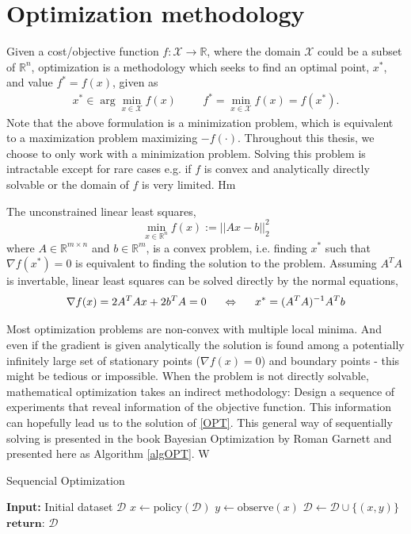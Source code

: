 \section{Optimization methodology}
Given a cost/objective function $f: \mathcal{X} \rightarrow \mathbb{R}$, where the domain
$\mathcal{X}$ could be a subset of $\mathbb{R}^n$,
optimization is a methodology which seeks to find an optimal point, $x^*$, and value
$f^* = f(x)$, given as
\begin{align}\label{OPT}
    x^* \in \arg\min_{x \in \mathcal{X}} f(x) \hspace{1cm} f^* = \min_{x \in \mathcal{X}} f(x) = f(x^*).
\end{align}
Note that the above formulation is a minimization problem, which is equivalent to a
maximization problem maximizing $-f(\cdot)$. Throughout this thesis, we choose to only work
with a minimization problem. 
Solving this problem is intractable except for rare cases e.g. if $f$ is 
convex and analytically directly solvable or the domain of $f$ is very limited. Hm

\begin{testexample}
    The unconstrained linear least squares, $$\min_{x\in \mathbb{R}^n} f(x) := ||Ax-b||_2^2$$
    where $A \in \mathbb{R}^{m\times n}$ and $b \in \mathbb{R}^m$, is a convex problem,
    i.e. finding $x^*$ such that $\nabla f(x^*) = 0$ is equivalent to finding the solution
    to the problem. Assuming $A^TA$ is invertable, linear least squares can be solved
    directly by the normal equations, 
    $$\nabla f(x) = 2A^TAx + 2b^TA = 0 \hspace{0.5cm} \Leftrightarrow \hspace{0.5cm} x^* = (A^TA)^{-1} A^Tb$$
\end{testexample}

Most optimization problems are non-convex with multiple local minima. And even if the gradient is
given analytically the solution is found among a potentially infinitely large 
set of stationary points ($\nabla f(x) = 0$) and boundary points - this might be tedious or impossible.
When the problem is not directly solvable, mathematical optimization takes an indirect methodology: 
Design a sequence of experiments that reveal information of the objective function. This information 
can hopefully lead us to the solution of \eqref{OPT}. This general way of sequentially solving 
is presented in the book Bayesian Optimization by Roman Garnett \cite{bayesoptbook} and 
presented here as Algorithm \ref{algOPT}. 
W
\begin{algorithm}
\caption{Sequencial Optimization \cite{bayesoptbook} }\label{algOPT}
\begin{algorithmic}
\State \textbf{Input:} Initial dataset $\mathcal{D}$  
    \State $x \gets \text{policy}(\mathcal{D})$ 
    \State $y \gets \text{observe}(x)$ 
    \State $\mathcal{D} \gets \mathcal{D} \cup \{(x,y)\} $ 
\EndWhile
\State $\textbf{return: } \mathcal{D}$
\end{algorithmic}
\end{algorithm}

